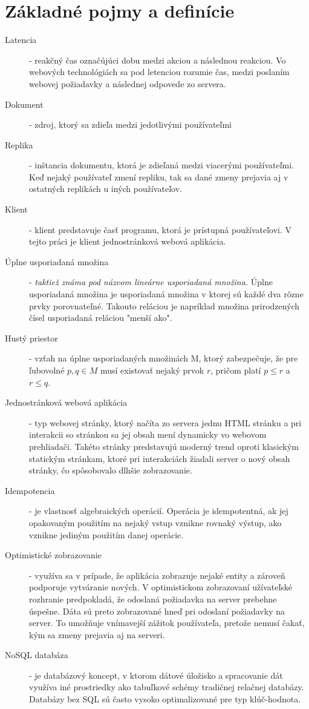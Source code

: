 \chapter{Základné pojmy a definície}

\label{kap:zakladne} %

\begin{description}
\item [Latencia] - reakčný čas označújúci dobu medzi akciou a následnou reakciou. Vo webových 
technológiách sa pod letenciou rozumie čas, medzi poslaním webovej požiadavky a následnej
odpovede zo servera.
\item [Dokument] - zdroj, ktorý sa zdieľa medzi jedotlivými používateľmi
\item [Replika] - inštancia dokumentu, ktorá je zdieľaná medzi viacerými používateľmi. Keď nejaký
používateľ zmení repliku, tak sa dané zmeny prejavia aj v ostatných replikách u iných
používateľov.
\item [Klient] - klient predstavuje časť programu, ktorá je prístupná používateľovi. V tejto práci
je klient jednostránková webová aplikácia.
\item [Úplne usporiadaná množina] - \textit{taktiež známa pod názvom lineárne usporiadaná množina.} 
Úplne usporiadaná množina je usporiadaná množina v ktorej sú každé dva rôzne prvky porovnateľné. 
Takouto reláciou je napríklad množina prirodzených čísel usporiadaná reláciou "menší ako".
\item [Hustý priestor] - vzťah na úplne usporiadaných množinách M, ktorý zabezpečuje, že pre 
ľubovolné $p, q \in M$ musí existovať nejaký prvok $r$, pričom platí $p \leq r$ a 
$r \leq q$.
\item [Jednostránková webová aplikácia] - typ webovej stránky, ktorý načíta zo servera jednu HTML
stránku a pri interakcii so stránkou sa jej obsah mení dynamicky vo webovom prehliadači. Takéto
stránky predstavujú moderný trend oproti klasickým statickým stránkam, ktoré pri interakciách
žiadali server o nový obsah stránky, čo spôsobovalo dlhšie zobrazovanie.
\item [Idempotencia] - je vlastnosť algebraických operácií. Operácia je idempotentná, ak jej
opakovaným použitím na nejaký vstup vznikne rovnaký výstup, ako vznikne jediným použitím danej
operácie.
\item [Optimistické zobrazovanie] - využíva sa v prípade, že aplikácia zobrazuje nejaké entity a
zároveň podporuje vytváranie nových. V optimistickom zobrazovaní užívateľské rozhranie predpokladá,
že odoslaná požiadavka na server prebehne úspešne. Dáta sú preto zobrazované hneď pri odoslaní
požiadavky na server. To umožňuje vnímavejší zážitok používateľa, pretože nemusí čakať, kým sa
zmeny prejavia aj na serveri.
\item [NoSQL databáza] - je databázový koncept, v ktorom dátové úložisko a spracovanie dát využíva
iné prostriedky ako tabuľkové schémy tradičnej relačnej databázy. Databázy bez SQL sú často vysoko
optimalizované pre typ klúč-hodnota.
\end{description}

